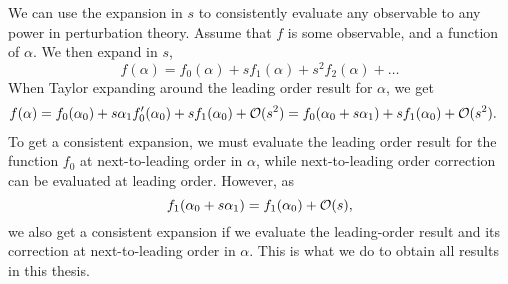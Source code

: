 We can use the expansion in $s$ to consistently evaluate any observable to any power in perturbation theory.
Assume that $f$ is some observable, and a function of $\alpha$.
We then expand in $s$,
%
\begin{equation}
    f(\alpha) = f_0(\alpha) + s f_1(\alpha) + s^2 f_2(\alpha) + \dots
\end{equation}
%
When Taylor expanding around the leading order result for $\alpha$, we get
%
\begin{align*}
    f(\alpha) 
    & 
    = 
    f_0(\alpha_0)
    +
    s\alpha_1  f_0'(\alpha_0)
    +
    s f_1(\alpha_0)
    + \mathcal O(s^2)
    = f_0(\alpha_0 + s \alpha_1)
    + s f_1(\alpha_0)
    + \mathcal O(s^2).
\end{align*}
%
To get a consistent expansion, we must evaluate the leading order result for the function $f_0$ at next-to-leading order in $\alpha$, while next-to-leading order correction can be evaluated at leading order.
However, as
%
\begin{equation}
    f_1(\alpha_0 + s\alpha_1) = f_1(\alpha_0) + \mathcal O(s),
\end{equation}
%
we also get a consistent expansion if we evaluate the leading-order result and its correction at next-to-leading order in $\alpha$.
This is what we do to obtain all results in this thesis.
